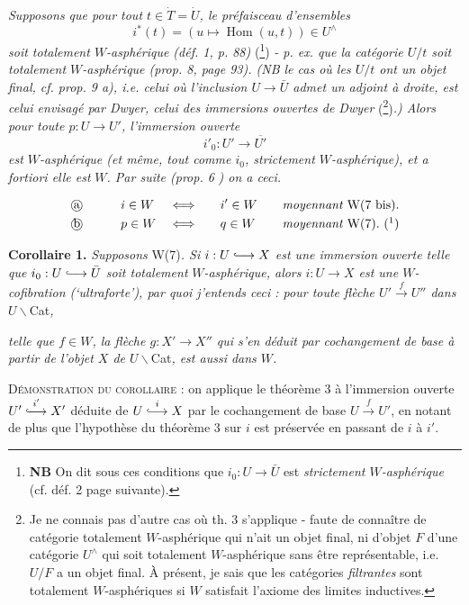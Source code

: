 \documentclass[11pt]{article}
\newcommand{\msp}[1]{\marginpar{\footnotesize [#1]}}
\newcommand{\hra}{\lhook\joinrel\longrightarrow}
\begin{document}
\textit{Supposons que pour tout $t\in\dot{T}=\dot{U}$, le préfaisceau d'ensembles}
\[ i^*(t)=(u\longmapsto\operatorname{Hom}(u,t))\in U^\wedge \]
\textit{soit totalement $W$-asphérique (déf. 1, p. 88)} (\footnote{\textbf{NB} On dit sous ces conditions que $i_0:U\longrightarrow\bar{U}$ est \textit{strictement $W$-asphérique} (cf. déf. 2 page suivante).}) \textit{- p. ex. que la catégorie $U/t$ soit totalement $W$-asphérique (prop. 8, page 93). (NB le cas où les $U/t$ ont un objet final, cf. prop. 9 a), i.e. celui où l'inclusion $U\longrightarrow\bar{U}$ admet un adjoint à droite, est celui envisagé par Dwyer, celui des immersions ouvertes de Dwyer} (\footnote{Je ne connais pas d'autre cas où th. 3 s'applique - faute de connaître de catégorie totalement $W$-asphérique qui n'ait un objet final, ni d'objet $F$ d'une catégorie $U^\wedge$ qui soit totalement $W$-asphérique sans être représentable, i.e. $U/F$ a un objet final. À présent, je sais que les catégories \textit{filtrantes} sont totalement $W$-asphériques si $W$ satisfait l'axiome des limites inductives.})\textit{.) Alors pour toute $p:U\longrightarrow U'$, l'immersion ouverte}
\[ i'_0:U'\longrightarrow\overline{U'} \]
\textit{est $W$-asphérique (et même, tout comme $i_0$, strictement $W$-asphérique), et a fortiori elle est} \textit{$W$. Par suite (prop. 6} \textit{) on a ceci.}

\[
\begin{aligned}
&\text{\textcircled{a}}\qquad && i\in W && \Longleftrightarrow\quad && i'\in W\quad && \textit{moyennant } \mathrm{W}(7\text{ bis}).\\
&\text{\textcircled{b}}\qquad && p\in W && \Longleftrightarrow\quad && q\in W\quad && \textit{moyennant } \mathrm{W}(7).\ (\footnotemark)
\end{aligned}
\]

\textbf{Corollaire 1.} \textit{Supposons} W(7)\textit{. Si $i:U\hra X$ est une immersion ouverte telle que $i_0:U\hra\bar{U}$ soit totalement} \textit{$W$-asphérique, alors $i:U\longrightarrow X$ est une $W$-cofibration (`ultraforte'), par quoi j'entends ceci : pour toute flèche $U'\xrightarrow{f}U''$ dans $U\backslash$}Cat\textit{,}

\msp{page 109}

\textit{telle que $f\in W$, la flèche $g:X'\longrightarrow X''$ qui s'en déduit par cochangement de base à partir de l'objet $X$ de $U\backslash$}Cat\textit{, est aussi dans $W$.}

\textsc{Démonstration du corollaire} : on applique le théorème 3 à l'immersion ouverte $U'\overset{i'}{\hra}X'$ déduite de $U\overset{i}{\hra}X$ par le cochangement de base $U\xrightarrow{f}U'$, en notant de plus que l'hypothèse du théorème 3 sur $i$ est préservée en passant de $i$ à $i'$.
\end{document}
